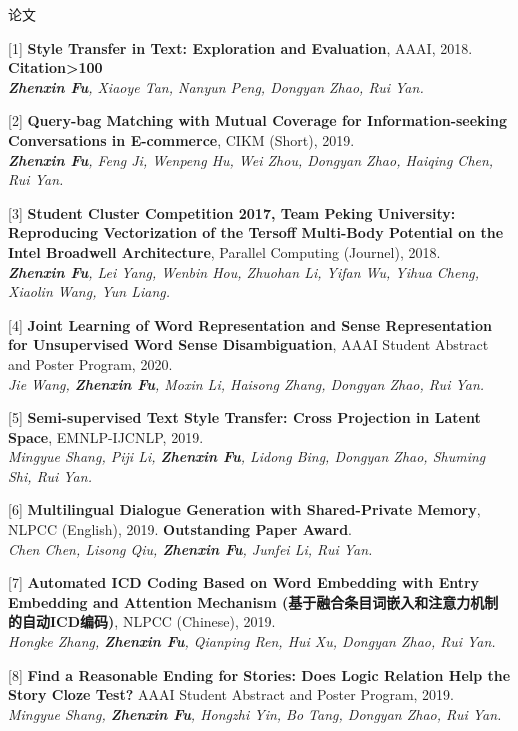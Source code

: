 \documentclass{resume} %
\begin{document}
\begin{rSection}{论文}
    
    [1] \textbf{Style Transfer in Text: Exploration and Evaluation}, AAAI, 2018. \textbf{Citation>100}\\
    {\it \textbf{Zhenxin Fu}, Xiaoye Tan, Nanyun Peng, Dongyan Zhao, Rui Yan.}
    
    [2] \textbf{Query-bag Matching with Mutual Coverage for Information-seeking Conversations in E-commerce}, CIKM (Short), 2019. \\
    {\it \textbf{Zhenxin Fu}, Feng Ji, Wenpeng Hu, Wei Zhou, Dongyan Zhao, Haiqing Chen, Rui Yan.}

    [3] \textbf{Student Cluster Competition 2017, Team Peking University: Reproducing Vectorization of the Tersoff Multi-Body Potential on the Intel Broadwell Architecture}, Parallel Computing (Journel), 2018. \\
    {\it \textbf{Zhenxin Fu}, Lei Yang, Wenbin Hou, Zhuohan Li, Yifan Wu, Yihua Cheng, Xiaolin Wang, Yun Liang.}

    [4] \textbf{Joint Learning of Word Representation and Sense Representation for Unsupervised Word Sense Disambiguation}, AAAI Student Abstract and Poster Program, 2020. \\
    {\it Jie Wang, \textbf{Zhenxin Fu}, Moxin Li, Haisong Zhang, Dongyan Zhao, Rui Yan.}

    [5] \textbf{Semi-supervised Text Style Transfer: Cross Projection in Latent Space}, EMNLP-IJCNLP, 2019. \\
    {\it Mingyue Shang, Piji Li, \textbf{Zhenxin Fu}, Lidong Bing, Dongyan Zhao, Shuming Shi, Rui Yan.}

    [6] \textbf{Multilingual Dialogue Generation with Shared-Private Memory}, NLPCC (English), 2019. \textbf{Outstanding Paper Award}. \\
    {\it Chen Chen, Lisong Qiu, \textbf{Zhenxin Fu}, Junfei Li, Rui Yan. }

    [7] \textbf{Automated ICD Coding Based on Word Embedding with Entry Embedding and Attention Mechanism (基于融合条目词嵌入和注意力机制的自动ICD编码)}, NLPCC (Chinese), 2019. \\
    {\it Hongke Zhang, \textbf{Zhenxin Fu}, Qianping Ren, Hui Xu, Dongyan Zhao, Rui Yan.}

    [8] \textbf{Find a Reasonable Ending for Stories: Does Logic Relation Help the Story Cloze Test?} AAAI Student Abstract and Poster Program, 2019. \\
    {\it Mingyue Shang, \textbf{Zhenxin Fu}, Hongzhi Yin, Bo Tang, Dongyan Zhao, Rui Yan.}


\end{rSection}
\end{document}

